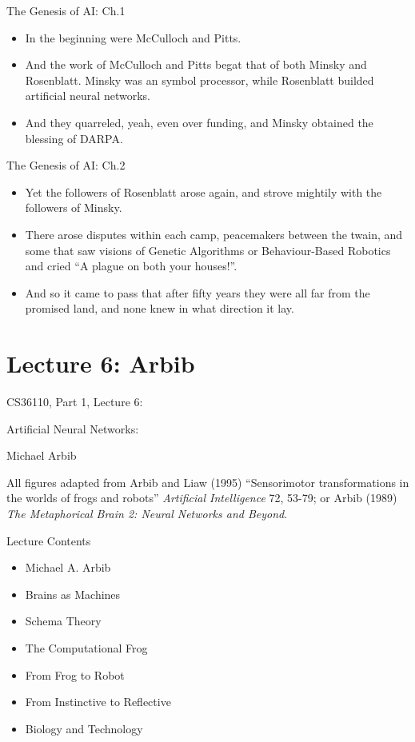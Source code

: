 \documentclass{article}
\begin{document}
\begin{slide}{}
{\Large The Genesis of AI: Ch.1}
\begin{itemize}
\item In the beginning were McCulloch and Pitts.
\item And the work of McCulloch and Pitts begat that of both Minsky
and Rosenblatt. Minsky was an symbol processor, while Rosenblatt
builded artificial neural networks.
\item And they quarreled, yeah, even over funding, and Minsky obtained
the blessing of DARPA.
\end{itemize}
\end{slide}

\begin{slide}{}
{\Large The Genesis of AI: Ch.2}
\begin{itemize}
\item Yet the followers of Rosenblatt arose again, and strove mightily
with the followers of Minsky.
\item There arose disputes within each camp, peacemakers between the
twain, and some that saw visions of Genetic Algorithms or
Behaviour-Based Robotics and cried ``A plague on both your houses!''.
\item And so it came to pass that after fifty years they were all far
from the promised land, and none knew in what direction it lay.
\end{itemize}
\end{slide}

\section{Lecture 6: Arbib}
\begin{slide}{}
{\Large CS36110, Part 1, Lecture 6:}

{\Large Artificial Neural Networks:}

{\Large Michael Arbib}

{\small All figures adapted from Arbib and Liaw (1995) ``Sensorimotor
transformations in the worlds of frogs and robots'' {\em Artificial
Intelligence} 72, 53-79; or Arbib (1989) {\em The Metaphorical Brain 2:
Neural Networks and Beyond}.}

\end{slide}

\begin{slide}{}
{\Large Lecture Contents}
\begin{itemize}
\item Michael A. Arbib
\item Brains as Machines
\item Schema Theory
\item The Computational Frog
\item From Frog to Robot
\item From Instinctive to Reflective
\item Biology and Technology
\end{itemize}
\end{slide}
\end{document}
